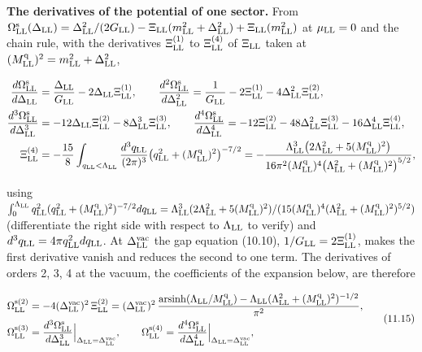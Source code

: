 \documentclass[
  10pt,
]{article}
\begin{document}
\textbf{The derivatives of the potential of one sector.} From
\(\Omega^{\rm s}_{\rm LL}(\Delta_{\rm LL})=\Delta_{\rm LL}^2/(2G_{\rm LL})-\Xi_{\rm LL}(m_{\rm LL}^2+\Delta_{\rm LL}^2)+\Xi_{\rm LL}(m_{\rm LL}^2)\)
at \(\mu_{\rm LL}=0\) and the chain rule, with the derivatives
\(\Xi^{(1)}_{\rm LL}\) to \(\Xi^{(4)}_{\rm LL}\) of \(\Xi_{\rm LL}\)
taken at \((M^{\rm q}_{\rm LL})^2=m_{\rm LL}^2+\Delta_{\rm LL}^2\),

\[\begin{aligned}\frac{d\Omega^{\rm s}_{\rm LL}}{d\Delta_{\rm LL}}&=\frac{\Delta_{\rm LL}}{G_{\rm LL}}-2\Delta_{\rm LL}\Xi^{(1)}_{\rm LL},\qquad\frac{d^2\Omega^{\rm s}_{\rm LL}}{d\Delta_{\rm LL}^2}=\frac1{G_{\rm LL}}-2\Xi^{(1)}_{\rm LL}-4\Delta_{\rm LL}^2\Xi^{(2)}_{\rm LL},\\\frac{d^3\Omega^{\rm s}_{\rm LL}}{d\Delta_{\rm LL}^3}&=-12\Delta_{\rm LL}\Xi^{(2)}_{\rm LL}-8\Delta_{\rm LL}^3\Xi^{(3)}_{\rm LL},\qquad\frac{d^4\Omega^{\rm s}_{\rm LL}}{d\Delta_{\rm LL}^4}=-12\Xi^{(2)}_{\rm LL}-48\Delta_{\rm LL}^2\Xi^{(3)}_{\rm LL}-16\Delta_{\rm LL}^4\Xi^{(4)}_{\rm LL},\\\Xi^{(4)}_{\rm LL}&=-\frac{15}8\int_{q_{\rm LL}<\Lambda_{\rm LL}}\frac{d^3q_{\rm LL}}{(2\pi)^3}\big(q_{\rm LL}^2+(M^{\rm q}_{\rm LL})^2\big)^{-7/2}=-\frac{\Lambda_{\rm LL}^3\big(2\Lambda_{\rm LL}^2+5(M^{\rm q}_{\rm LL})^2\big)}{16\pi^2(M^{\rm q}_{\rm LL})^4\big(\Lambda_{\rm LL}^2+(M^{\rm q}_{\rm LL})^2\big)^{5/2}},\end{aligned}\]

using
\(\int_0^{\Lambda_{\rm LL}}q_{\rm LL}^2(q_{\rm LL}^2+(M^{\rm q}_{\rm LL})^2)^{-7/2}dq_{\rm LL}=\Lambda_{\rm LL}^3(2\Lambda_{\rm LL}^2+5(M^{\rm q}_{\rm LL})^2)/(15(M^{\rm q}_{\rm LL})^4(\Lambda_{\rm LL}^2+(M^{\rm q}_{\rm LL})^2)^{5/2})\)
(differentiate the right side with respect to \(\Lambda_{\rm LL}\) to
verify) and \(d^3q_{\rm LL}=4\pi q_{\rm LL}^2dq_{\rm LL}\). At
\(\Delta^{\rm vac}_{\rm LL}\) the gap equation (10.10),
\(1/G_{\rm LL}=2\Xi^{(1)}_{\rm LL}\), makes the first derivative vanish
and reduces the second to one term. The derivatives of orders 2, 3, 4 at
the vacuum, the coefficients of the expansion below, are therefore

\[\begin{aligned}\Omega^{\rm s(2)}_{\rm LL}&=-4(\Delta^{\rm vac}_{\rm LL})^2\,\Xi^{(2)}_{\rm LL}=(\Delta^{\rm vac}_{\rm LL})^2\,\frac{\mathrm{arsinh}(\Lambda_{\rm LL}/M^{\rm q}_{\rm LL})-\Lambda_{\rm LL}(\Lambda_{\rm LL}^2+(M^{\rm q}_{\rm LL})^2)^{-1/2}}{\pi^2},\\\Omega^{\rm s(3)}_{\rm LL}&=\frac{d^3\Omega^{\rm s}_{\rm LL}}{d\Delta_{\rm LL}^3}\Big|_{\Delta_{\rm LL}=\Delta^{\rm vac}_{\rm LL}},\qquad\Omega^{\rm s(4)}_{\rm LL}=\frac{d^4\Omega^{\rm s}_{\rm LL}}{d\Delta_{\rm LL}^4}\Big|_{\Delta_{\rm LL}=\Delta^{\rm vac}_{\rm LL}},\end{aligned}\tag{11.15}\]
\end{document}
